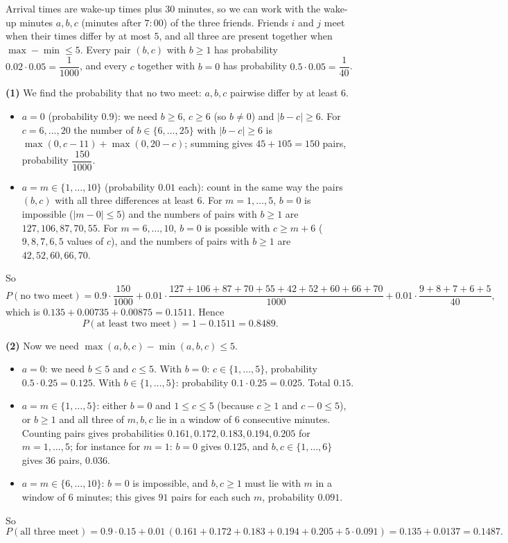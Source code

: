 Arrival times are wake-up times plus $30$ minutes, so we can work with the wake-up minutes $a,b,c$ (minutes after $7{:}00$) of the three friends. Friends $i$ and $j$ meet when their times differ by at most $5$, and all three are present together when $\max-\min\le5$. Every pair $(b,c)$ with $b\ge1$ has probability $0.02\cdot0.05=\dfrac1{1000}$, and every $c$ together with $b=0$ has probability $0.5\cdot0.05=\dfrac1{40}$.

\textbf{(1)} We find the probability that no two meet: $a,b,c$ pairwise differ by at least $6$.
\begin{itemize}
\item $a=0$ (probability $0.9$): we need $b\ge6$, $c\ge6$ (so $b\neq0$) and $|b-c|\ge6$. For $c=6,\dots,20$ the number of $b\in\{6,\dots,25\}$ with $|b-c|\ge6$ is $\max(0,c-11)+\max(0,20-c)$; summing gives $45+105=150$ pairs, probability $\dfrac{150}{1000}$.
\item $a=m\in\{1,\dots,10\}$ (probability $0.01$ each): count in the same way the pairs $(b,c)$ with all three differences at least $6$. For $m=1,\dots,5$, $b=0$ is impossible ($|m-0|\le5$) and the numbers of pairs with $b\ge1$ are $127,106,87,70,55$. For $m=6,\dots,10$, $b=0$ is possible with $c\ge m+6$ ($9,8,7,6,5$ values of $c$), and the numbers of pairs with $b\ge1$ are $42,52,60,66,70$.
\end{itemize}
So
\[P(\text{no two meet})=0.9\cdot\dfrac{150}{1000}+0.01\cdot\dfrac{127+106+87+70+55+42+52+60+66+70}{1000}+0.01\cdot\dfrac{9+8+7+6+5}{40},\]
which is $0.135+0.00735+0.00875=0.1511$. Hence
\[P(\text{at least two meet})=1-0.1511=\boxed{0.8489}.\]

\textbf{(2)} Now we need $\max(a,b,c)-\min(a,b,c)\le5$.
\begin{itemize}
\item $a=0$: we need $b\le5$ and $c\le5$. With $b=0$: $c\in\{1,\dots,5\}$, probability $0.5\cdot0.25=0.125$. With $b\in\{1,\dots,5\}$: probability $0.1\cdot0.25=0.025$. Total $0.15$.
\item $a=m\in\{1,\dots,5\}$: either $b=0$ and $1\le c\le5$ (because $c\ge1$ and $c-0\le5$), or $b\ge1$ and all three of $m,b,c$ lie in a window of $6$ consecutive minutes. Counting pairs gives probabilities $0.161,0.172,0.183,0.194,0.205$ for $m=1,\dots,5$; for instance for $m=1$: $b=0$ gives $0.125$, and $b,c\in\{1,\dots,6\}$ gives $36$ pairs, $0.036$.
\item $a=m\in\{6,\dots,10\}$: $b=0$ is impossible, and $b,c\ge1$ must lie with $m$ in a window of $6$ minutes; this gives $91$ pairs for each such $m$, probability $0.091$.
\end{itemize}
So
\[P(\text{all three meet})=0.9\cdot0.15+0.01\,(0.161+0.172+0.183+0.194+0.205+5\cdot0.091)=0.135+0.0137=\boxed{0.1487}.\]
